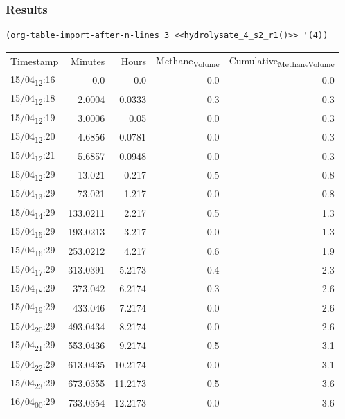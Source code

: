 \documentclass[11pt]{article}
\begin{document}
\subsubsection{Results}
\label{sec:org15d0df1}

\begin{verbatim}
(org-table-import-after-n-lines 3 <<hydrolysate_4_s2_r1()>> '(4))
\end{verbatim}

\begin{center}
\begin{tabular}{lrrrr}
Timestamp & Minutes & Hours & Methane\textsubscript{Volume} & Cumulative\textsubscript{Methane}\textsubscript{Volume}\\[0pt]
15/04\textsubscript{12}:16 & 0.0 & 0.0 & 0.0 & 0.0\\[0pt]
15/04\textsubscript{12}:18 & 2.0004 & 0.0333 & 0.3 & 0.3\\[0pt]
15/04\textsubscript{12}:19 & 3.0006 & 0.05 & 0.0 & 0.3\\[0pt]
15/04\textsubscript{12}:20 & 4.6856 & 0.0781 & 0.0 & 0.3\\[0pt]
15/04\textsubscript{12}:21 & 5.6857 & 0.0948 & 0.0 & 0.3\\[0pt]
15/04\textsubscript{12}:29 & 13.021 & 0.217 & 0.5 & 0.8\\[0pt]
15/04\textsubscript{13}:29 & 73.021 & 1.217 & 0.0 & 0.8\\[0pt]
15/04\textsubscript{14}:29 & 133.0211 & 2.217 & 0.5 & 1.3\\[0pt]
15/04\textsubscript{15}:29 & 193.0213 & 3.217 & 0.0 & 1.3\\[0pt]
15/04\textsubscript{16}:29 & 253.0212 & 4.217 & 0.6 & 1.9\\[0pt]
15/04\textsubscript{17}:29 & 313.0391 & 5.2173 & 0.4 & 2.3\\[0pt]
15/04\textsubscript{18}:29 & 373.042 & 6.2174 & 0.3 & 2.6\\[0pt]
15/04\textsubscript{19}:29 & 433.046 & 7.2174 & 0.0 & 2.6\\[0pt]
15/04\textsubscript{20}:29 & 493.0434 & 8.2174 & 0.0 & 2.6\\[0pt]
15/04\textsubscript{21}:29 & 553.0436 & 9.2174 & 0.5 & 3.1\\[0pt]
15/04\textsubscript{22}:29 & 613.0435 & 10.2174 & 0.0 & 3.1\\[0pt]
15/04\textsubscript{23}:29 & 673.0355 & 11.2173 & 0.5 & 3.6\\[0pt]
16/04\textsubscript{00}:29 & 733.0354 & 12.2173 & 0.0 & 3.6\\[0pt]

\end{tabular}
\end{center}
\end{document}
